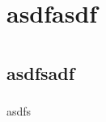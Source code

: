 \documentclass[a4papper]{article}
\title{}
\author{
 Wu You\\	
 }
\begin{document}
  	\maketitle
  	\tableofcontents
  	\thispagestyle{empty}%
  \newpage
  	\setcounter{page}{1}%
  	\setcounter{section}{0}%
  	\section{asdfasdf}
  	\section{}
  	\subsection{asdfsadf}
  	\subsubsection{}
  	\par\setlength{\parindent}{2em} %
  	asdfs
  
\end{document}

